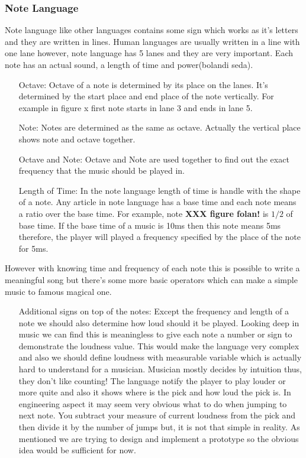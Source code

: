\documentclass{report}
\begin{document}
\subsubsection{Note Language}
Note language like other languages contains some sign which works as it's letters and they are written in lines. Human languages are usually written in a line with one lane however, note language has 5 lanes and they are very important. Each note has an actual sound, a length of time and power(bolandi seda). 
\begin{itemize}
\item[Octave: ]{Octave of a note is determined by its place on the lanes. It's determined by the start place and end place of the note vertically. For example in figure x first note starts in lane 3 and ends in lane 5. }
\item[Note: ]{Notes are determined as the same as octave. Actually the vertical place shows note and octave together.}
\item[Octave and Note: ]{Octave and Note are used together to find out the exact frequency that the music should be played in. }
\item[Length of Time: ]{In the note language length of time is handle with the shape of a  note. Any article in note language has a base time and each note means a ratio over the base time. For example, note \textbf{XXX figure folan!} is $1/2$ of base time. If the base time of a music is 10ms then this note means 5ms therefore, the player will played a frequency specified by the place of the note for 5ms.}
\end{itemize}
However with knowing time and frequency of each note this is possible to write a meaningful song but there's some more basic operators which can make a simple music to famous magical one.
\begin{itemize}
\item[Additional signs  on top of the notes: ]{Except the frequency and length of a note we should also determine how loud should it be played. Looking deep in music we can find this is meaningless to give each note a number or sign to demonstrate the loudness value. This would make the language very complex and also we should define loudness with measurable variable which is actually hard to understand for a musician. Musician mostly decides by intuition thus, they don't like counting! The language notify the player to play louder or more quite and also it shows where is the pick and how loud the pick is. In engineering aspect it may seem very obvious what to do when jumping to next note. You subtract your measure of current loudness from the pick and then divide it by the number of jumps but, it is not that simple in reality. As mentioned we are trying to design and implement a prototype so the obvious idea would be sufficient for now. }
\end{itemize} 
\end{document}
